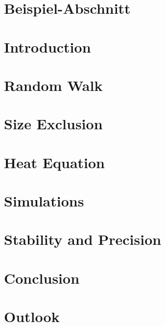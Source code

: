 \documentclass[10pt, a4paper, titlepage]{article}
\numberwithin{equation}{section}
\begin{document}
\hypersetup{pageanchor=false}


\newpage

\thispagestyle{empty}



\newpage

\tableofcontents

\newpage
\hypersetup{pageanchor=true}
\renewcommand{\thepage}{ \arabic{page} }

\setcounter{page}{1}
\onehalfspacing

\section{Beispiel-Abschnitt}


\section{Introduction}


\section{Random Walk}

\section{Size Exclusion}

\section{Heat Equation}

\section{Simulations}

\section{Stability and Precision}

\section{Conclusion}

\section{Outlook}

\vspace{\fill}
\printbibliography{}
\end{document}
